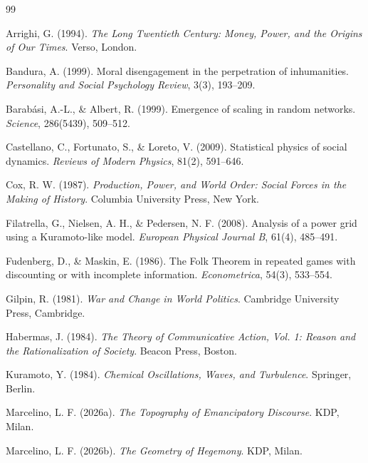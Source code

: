 \documentclass[12pt]{article}
\theoremstyle{plain}
\theoremstyle{definition}
\theoremstyle{remark}
\begin{document}
\begin{thebibliography}{99}

Arrighi, G. (1994). \textit{The Long Twentieth Century: Money, Power, and the Origins of Our Times}. Verso, London.

Bandura, A. (1999). Moral disengagement in the perpetration of inhumanities. \textit{Personality and Social Psychology Review}, 3(3), 193--209.

Barabási, A.-L., \& Albert, R. (1999). Emergence of scaling in random networks. \textit{Science}, 286(5439), 509--512.

Castellano, C., Fortunato, S., \& Loreto, V. (2009). Statistical physics of social dynamics. \textit{Reviews of Modern Physics}, 81(2), 591--646.

Cox, R. W. (1987). \textit{Production, Power, and World Order: Social Forces in the Making of History}. Columbia University Press, New York.

Filatrella, G., Nielsen, A. H., \& Pedersen, N. F. (2008). Analysis of a power grid using a Kuramoto-like model. \textit{European Physical Journal B}, 61(4), 485--491.

Fudenberg, D., \& Maskin, E. (1986). The Folk Theorem in repeated games with discounting or with incomplete information. \textit{Econometrica}, 54(3), 533--554.

Gilpin, R. (1981). \textit{War and Change in World Politics}. Cambridge University Press, Cambridge.

Habermas, J. (1984). \textit{The Theory of Communicative Action, Vol. 1: Reason and the Rationalization of Society}. Beacon Press, Boston.

Kuramoto, Y. (1984). \textit{Chemical Oscillations, Waves, and Turbulence}. Springer, Berlin.

Marcelino, L. F. (2026a). \textit{The Topography of Emancipatory Discourse}. KDP, Milan.

Marcelino, L. F. (2026b). \textit{The Geometry of Hegemony}. KDP, Milan.


\end{thebibliography}
\end{document}
